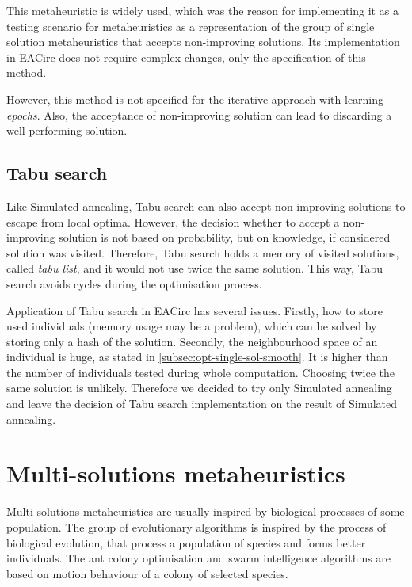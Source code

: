 \documentclass[
  print, %
  Table,   %
  nolof,     %
  nolot,     %
  11pt, %
  oneside  %
]{fithesis3}
\begin{document}
This metaheuristic is widely used, which was the reason for implementing it as a testing scenario for metaheuristics as a representation of the group of single solution metaheuristics that accepts non-improving solutions. Its implementation in EACirc does not require complex changes, only the specification of this method.

However, this method is not specified for the iterative approach with learning \textit{epochs}. Also, the acceptance of non-improving solution can lead to discarding a well-performing solution.

\subsection{Tabu search}
\label{subsec:opt-single-sol-tabu}

Like Simulated annealing, Tabu search can also accept non-improving solutions to escape from local optima. However, the decision whether to accept a non-improving solution is not based on probability, but on knowledge, if considered solution was visited. Therefore, Tabu search holds a memory of visited solutions, called \textit{tabu list}, and it would not use twice the same solution. This way, Tabu search avoids cycles during the optimisation process.

Application of Tabu search in EACirc has several issues. Firstly, how to store used individuals (memory usage may be a problem), which can be solved by storing only a hash of the solution. Secondly, the neighbourhood space of an individual is huge, as stated in \cref{subsec:opt-single-sol-smooth}. It is higher than the number of individuals tested during whole computation. Choosing twice the same solution is unlikely. Therefore we decided to try only Simulated annealing and leave the decision of Tabu search implementation on the result of Simulated annealing.

\section{Multi-solutions metaheuristics}
\label{sec:opt-multi-sol}

Multi-solutions metaheuristics are usually inspired by biological processes of some population. The group of evolutionary algorithms is inspired by the process of biological evolution, that process a population of species and forms better individuals. The ant colony optimisation and swarm intelligence algorithms are based on motion behaviour of a colony of selected species.
\end{document}
